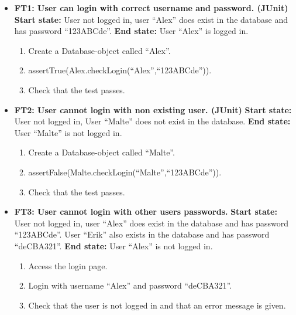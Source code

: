 \documentclass{article}
\begin{document}
	\begin{itemize}
		\item \textbf{FT1:  User can login with correct username and 			password. (JUnit)} \newline
		\textbf{Start state:} User not logged in, user “Alex” does exist in the database and has password “123ABCde”. \newline
		\textbf{End state:} User “Alex” is logged in. 
		\begin{enumerate}
			\item Create a Database-object called “Alex”.
			\item assertTrue(Alex.checkLogin(“Alex”,“123ABCde”)).
			\item Check that the test passes.
		\end{enumerate}
		
		\item \textbf{FT2:  User cannot login with non existing user. (JUnit)} \newline
		\textbf{Start state:} User not logged in, User “Malte” does not exist in the database. \newline
		\textbf{End state:} User “Malte” is not logged in.  
		\begin{enumerate}
			\item Create a Database-object called “Malte”.
			\item assertFalse(Malte.checkLogin(“Malte”,“123ABCde”)). 
			\item Check that the test passes.
		\end{enumerate}
		
		\item \textbf{FT3: User cannot login with other users passwords.} \newline
		\textbf{Start state:} User not logged in, user “Alex” does exist in the database and has password “123ABCde”. User “Erik” also exists in the database and has password “deCBA321”. \newline
		\textbf{End state:} User “Alex” is not logged in.   
		\begin{enumerate}
			\item  Access the login page. 
			\item Login with username “Alex” and password “deCBA321”. 
			\item Check that the user is not logged in and that an error message is given.
		\end{enumerate}
		

\end{itemize}
\end{document}
